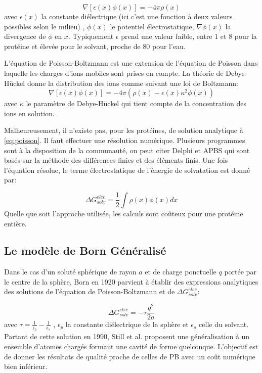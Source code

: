 \begin{equation}
  \label{eq:poisson}
  \nabla [ \epsilon(x) \phi(x)] = - 4 \pi \rho(x)   
\end{equation}
avec $\epsilon(x)$ la constante diélectrique (ici c'est une fonction à deux valeurs possibles selon le milieu) , $\phi (x)$ le potentiel électrostatique, $\nabla \phi(x)$ la divergence de $\phi$ en $x$.
Typiquement $\epsilon$ prend une valeur faible, entre $1$ et $8$ pour la protéine et élevée pour le solvant, proche de $80$ pour l'eau.

L'équation de Poisson-Boltzmann est une extension de l'équation de Poisson dans laquelle les charges d'ions mobiles sont prises en compte. La théorie de Debye-Hückel donne la distribution des ions comme suivant une loi de Boltzmann:
\begin{equation}
  \nabla [ \epsilon (x) \phi(x)] = -4 \pi ( \rho(x) - \epsilon(x) \kappa^2 \phi(x))
\end{equation}
avec $ \kappa $ le paramètre de Debye-Hückel qui tient compte de la concentration des ions en solution.

Malheureusement, il n'existe pas, pour les protéines, de solution analytique à \ref{eq:poisson}. Il faut effectuer une résolution numérique. Plusieurs programmes sont à la disposition de la communauté, on peut citer Delphi \cite{Rocchia02} et APBS \cite{Baker01}  qui sont basés sur la méthode des différences finies et des éléments finis. Une fois l'équation résolue, le terme électrostatique de l'énergie de solvatation est donné par:

\begin{equation}
\Delta G_{solv}^{elec} = \frac{1}{2} \int \rho(x)\phi(x)dx  
\end{equation}
Quelle que soit l'approche utilisée, les calculs sont coûteux pour une protéine entière.


\subsection{Le modèle de Born Généralisé}
\label{sub:GB}
Dans le cas d'un soluté sphérique de rayon $a$ et de charge ponctuelle $q$ portée par le centre de la sphère, Born en 1920 \cite{Born20} parvient à établir des expressions analytiques des solutions de l'équation de Poisson-Boltzmann et de $ \Delta G_{solv}^{elec}$:


\begin{equation}
  \label{eq:Born}
  \Delta G_{solv}^{elec} = - \tau \frac{q^2}{2a}
\end{equation}
avec $ \tau = \frac{1}{\epsilon_p} - \frac{1}{\epsilon_s}$ , $\epsilon_p$ la constante diélectrique de la sphère et $\epsilon_s$ celle du solvant. Partant de cette solution en 1990, Still et al. \cite{Still90} proposent une généralisation à un ensemble d'atomes chargés formant une cavité de forme quelconque. L'objectif est de donner les résultats de qualité proche de celles de PB avec un coût numérique bien inférieur.

